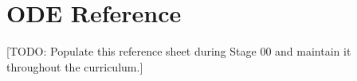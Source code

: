 
\section*{ODE Reference}

[TODO: Populate this reference sheet during Stage 00 and maintain it throughout the curriculum.]
